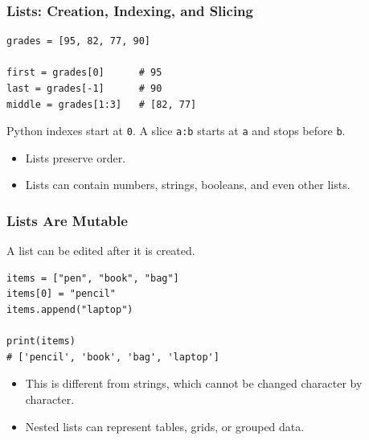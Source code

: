 \documentclass[aspectratio=169,10pt]{beamer}
\newcommand{\code}[1]{\texttt{#1}}
\newenvironment{bluebox}[1]{%
  \vspace{0.08cm}\begin{tcolorbox}[lecturebox,title={#1},fontupper=\small]%
}{\end{tcolorbox}\vspace{0.05cm}}
\begin{document}
\begin{frame}[fragile]
\frametitle{Lists: Creation, Indexing, and Slicing}
\begin{lstlisting}[style=py]
grades = [95, 82, 77, 90]

first = grades[0]      # 95
last = grades[-1]      # 90
middle = grades[1:3]   # [82, 77]
\end{lstlisting}
\begin{bluebox}{Beginner rule}
Python indexes start at \code{0}. A slice \code{a:b} starts at \code{a} and stops before \code{b}.
\end{bluebox}
\begin{itemize}
  \item Lists preserve order.
  \item Lists can contain numbers, strings, booleans, and even other lists.
\end{itemize}
\end{frame}

\begin{frame}[fragile]
\frametitle{Lists Are Mutable}
\begin{bluebox}{Mutable means changeable}
A list can be edited after it is created.
\end{bluebox}
\begin{lstlisting}[style=py]
items = ["pen", "book", "bag"]
items[0] = "pencil"
items.append("laptop")

print(items)
# ['pencil', 'book', 'bag', 'laptop']
\end{lstlisting}
\begin{itemize}
  \item This is different from strings, which cannot be changed character by character.
  \item Nested lists can represent tables, grids, or grouped data.
\end{itemize}
\end{frame}
\end{document}
